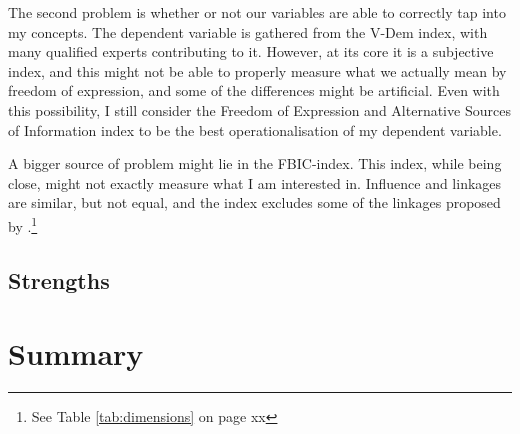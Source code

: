 The second problem is whether or not our variables are able to correctly tap into my concepts. The dependent variable is gathered from the V-Dem index, with many qualified experts contributing to it. However, at its core it is a subjective index, and this might not be able to properly measure what we actually mean by freedom of expression, and some of the differences might be artificial. Even with this possibility, I still consider the Freedom of Expression and Alternative Sources of Information index to be the best operationalisation of my dependent variable.

A bigger source of problem might lie in the FBIC-index. This index, while being close, might not exactly measure what I am interested in. Influence and linkages are similar, but not equal, and the index excludes some of the linkages proposed by \citet{levitsky_competitive_2010}.\footnote{See Table \ref{tab:dimensions} on page xx} 

\subsection{Strengths}

\section{Summary}
